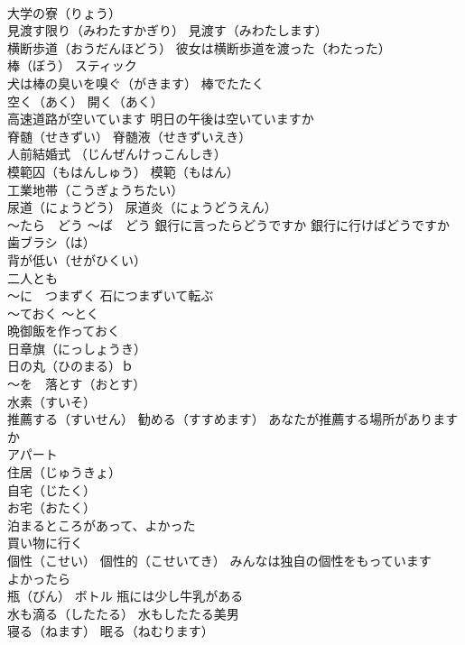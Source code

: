 \documentclass[8pt]{extreport}
\begin{document}
\begin{CJK}{UTF8}{min}
\\	大学の寮（りょう）
\\	見渡す限り（みわたすかぎり） 見渡す（みわたします）
\\	横断歩道（おうだんほどう） 彼女は横断歩道を渡った（わたった）
\\	棒（ぼう） スティック 
\\	犬は棒の臭いを嗅ぐ（がきます） 棒でたたく
\\	空く（あく） 開く（あく）
\\	高速道路が空いています 明日の午後は空いていますか
\\	脊髄（せきずい） 脊髄液（せきずいえき）
\\	人前結婚式 （じんぜんけっこんしき）
\\	模範囚（もはんしゅう） 模範（もはん）
\\	工業地帯（こうぎょうちたい）
\\	尿道（にょうどう） 尿道炎（にょうどうえん）
\\	～たら　どう ～ば　どう 銀行に言ったらどうですか 銀行に行けばどうですか
\\	歯ブラシ（は）
\\	背が低い（せがひくい）
\\	二人とも
\\	～に　つまずく 石につまずいて転ぶ
\\	～ておく ～とく 
\\	晩御飯を作っておく
\\	日章旗（にっしょうき）
\\	日の丸（ひのまる）ｂ
\\	～を　落とす（おとす）
\\	水素（すいそ）
\\	推薦する（すいせん） 勧める（すすめます） あなたが推薦する場所がありますか
\\	アパート 
\\	住居（じゅうきょ）
\\	自宅（じたく） 
\\	お宅（おたく）
\\	泊まるところがあって、よかった
\\	買い物に行く
\\	個性（こせい） 個性的（こせいてき） みんなは独自の個性をもっています
\\	よかったら
\\	瓶（びん） ボトル 瓶には少し牛乳がある
\\	水も滴る（したたる） 水もしたたる美男
\\	寝る（ねます） 眠る（ねむります）

\end{CJK}
\end{document}

